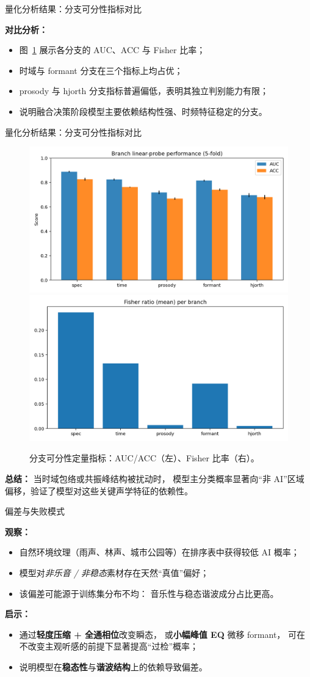 \documentclass[aspectratio=169]{beamer}
\begin{document}
\begin{frame}{量化分析结果：分支可分性指标对比}

\textbf{对比分析：}
\begin{itemize}
  \item 图~\ref{fig:branch_metrics} 展示各分支的 AUC、ACC 与 Fisher 比率；
  \item 时域与 formant 分支在三个指标上均占优；
  \item prosody 与 hjorth 分支指标普遍偏低，表明其独立判别能力有限；
  \item 说明融合决策阶段模型主要依赖结构性强、时频特征稳定的分支。
\end{itemize}
\end{frame}

\begin{frame}{量化分析结果：分支可分性指标对比}
\begin{figure}
  \centering
  \includegraphics[width=0.32\linewidth]{images_in_paper/branch_metrics_auc_acc.png}
  \includegraphics[width=0.32\linewidth]{images_in_paper/branch_fisher.png}
  \caption{分支可分性定量指标：AUC/ACC（左）、Fisher 比率（右）。}
  \label{fig:branch_metrics}
\end{figure}

\textbf{总结：}
当时域包络或共振峰结构被扰动时，  
模型主分类概率显著向“非 AI”区域偏移，验证了模型对这些关键声学特征的依赖性。
\end{frame}

\begin{frame}{偏差与失败模式}

\textbf{观察：}
\begin{itemize}
  \item 自然环境纹理（雨声、林声、城市公园等）在排序表中获得较低 AI 概率；
  \item 模型对\emph{非乐音 / 非稳态}素材存在天然“真值”偏好；
  \item 该偏差可能源于训练集分布不均：
        音乐性与稳态谐波成分占比更高。
\end{itemize}

\vspace{0.6em}
\textbf{启示：}
\begin{itemize}
  \item 通过\textbf{轻度压缩 + 全通相位}改变瞬态，
        或\textbf{小幅峰值 EQ} 微移 formant，
        可在不改变主观听感的前提下显著提高“过检”概率；
  \item 说明模型在\textbf{稳态性}与\textbf{谐波结构}上的依赖导致偏差。
\end{itemize}

\end{frame}
\end{document}

